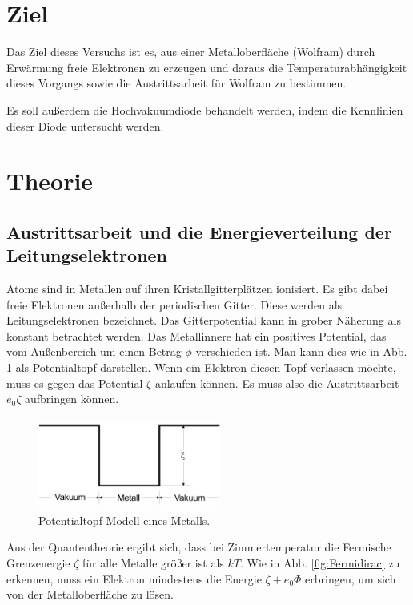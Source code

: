 \section{Ziel}
Das Ziel dieses Versuchs ist es, aus einer Metalloberfläche
(Wolfram) durch Erwärmung freie Elektronen zu erzeugen und
daraus die Temperaturabhängigkeit dieses Vorgangs sowie die
Austrittsarbeit für Wolfram zu bestimmen.

\noindent Es soll außerdem die Hochvakuumdiode behandelt werden,
indem die Kennlinien dieser Diode untersucht werden.

\section{Theorie}
\label{sec:Theorie}

\subsection{Austrittsarbeit und die Energieverteilung der Leitungselektronen}

Atome sind in Metallen auf ihren Kristallgitterplätzen 
ionisiert. Es gibt dabei freie Elektronen außerhalb 
der periodischen Gitter. Diese werden als Leitungselektronen 
bezeichnet. Das Gitterpotential kann in grober Näherung als 
konstant betrachtet werden. Das Metallinnere hat ein positives 
Potential, das vom Außenbereich um einen Betrag $\phi$ 
verschieden ist. Man kann dies wie in Abb. \ref{fig:topf}
als Potentialtopf darstellen. Wenn ein Elektron diesen Topf 
verlassen möchte, muss es gegen das Potential $\zeta$ 
anlaufen können. Es muss also die Austrittsarbeit $e_0 \zeta$ %
aufbringen können. 

\begin{figure}
    \centering
    \includegraphics[width=6cm, height=3cm]{build/potentialtopf.png}
    \caption{Potentialtopf-Modell eines Metalls. \cite{V504}}
    \label{fig:topf}
\end{figure}

\noindent Aus der Quantentheorie ergibt sich, dass bei Zimmertemperatur 
die Fermische Grenzenergie $\zeta$ für alle Metalle größer ist 
als $k T$. Wie in Abb. \ref{fig:Fermidirac} zu erkennen, muss
ein Elektron mindestens die Energie $\zeta + e_0 \Phi$ 
erbringen, um sich von der Metalloberfläche zu lösen. 


